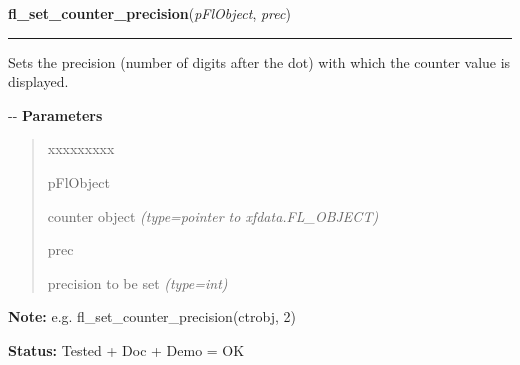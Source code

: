 \hspace{.8\funcindent}\begin{boxedminipage}{\funcwidth}

    \raggedright \textbf{fl\_set\_counter\_precision}(\textit{pFlObject}, \textit{prec})

    \vspace{-1.5ex}

    \rule{\textwidth}{0.5\fboxrule}
\setlength{\parskip}{2ex}

Sets the precision (number of digits after the dot) with which
the counter value is displayed.

-{}-
\setlength{\parskip}{1ex}
      \textbf{Parameters}
      \vspace{-1ex}

      \begin{quote}
        \begin{Ventry}{xxxxxxxxx}

          \item[pFlObject]


counter object
            {\it (type=pointer to xfdata.FL\_OBJECT)}

          \item[prec]


precision to be set
            {\it (type=int)}

        \end{Ventry}

      \end{quote}

\textbf{Note:} 
e.g. fl\_set\_counter\_precision(ctrobj, 2)


\textbf{Status:} 
Tested + Doc + Demo = OK


    \end{boxedminipage}

    \label{xformslib:flcounter:fl_get_counter_precision}

    \vspace{0.5ex}

